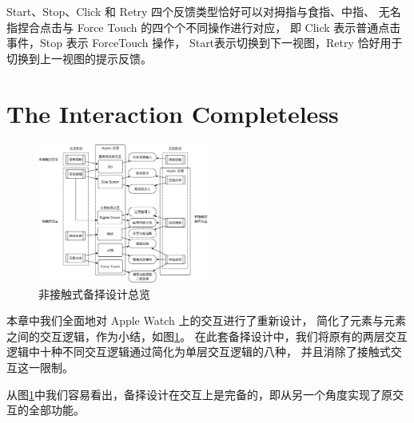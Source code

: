 Start、Stop、Click 和 Retry 四个反馈类型恰好可以对拇指与食指、中指、
无名指捏合点击与 Force Touch 的四个个不同操作进行对应，
即 Click 表示普通点击事件，Stop 表示 ForceTouch 操作，
Start表示切换到下一视图，Retry 恰好用于切换到上一视图的提示反馈。

\section{The Interaction Completeless}
\label{sec:completeless}

\begin{figure}[H]
    \kaishu
    \centering
    \includegraphics[width=0.5\textwidth]{figures/interaction}
    \caption{\kaishu 非接触式备择设计总览}
    \label{fig:interaction}
\end{figure}

本章中我们全面地对 Apple Watch 上的交互进行了重新设计，
简化了元素与元素之间的交互逻辑，作为小结，如图\ref{fig:interaction}。
在此套备择设计中，我们将原有的两层交互逻辑中十种不同交互逻辑通过简化为单层交互逻辑的八种，
并且消除了接触式交互这一限制。

从图\ref{fig:interaction}中我们容易看出，备择设计在交互上是完备的，即从另一个角度实现了原交互的全部功能。
